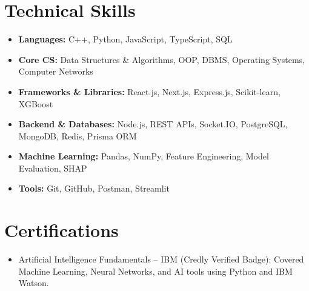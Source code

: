 \documentclass[10pt, a4paper]{article}
\begin{document}
\section{Technical Skills}
\begin{itemize}
    \item \textbf{Languages:} C++, Python, JavaScript, TypeScript, SQL
    \item \textbf{Core CS:} Data Structures \& Algorithms, OOP, DBMS, Operating Systems, Computer Networks
    \item \textbf{Frameworks \& Libraries:} React.js, Next.js, Express.js, Scikit-learn, XGBoost
    \item \textbf{Backend \& Databases:} Node.js, REST APIs, Socket.IO, PostgreSQL, MongoDB, Redis, Prisma ORM
    \item \textbf{Machine Learning:} Pandas, NumPy, Feature Engineering, Model Evaluation, SHAP
    \item \textbf{Tools:} Git, GitHub, Postman, Streamlit
\end{itemize}


\section{Certifications}
\begin{itemize}

    \item Artificial Intelligence Fundamentals -- IBM (Credly Verified Badge): Covered Machine Learning, Neural Networks, and AI tools using Python and IBM Watson.

\end{itemize}
\end{document}
